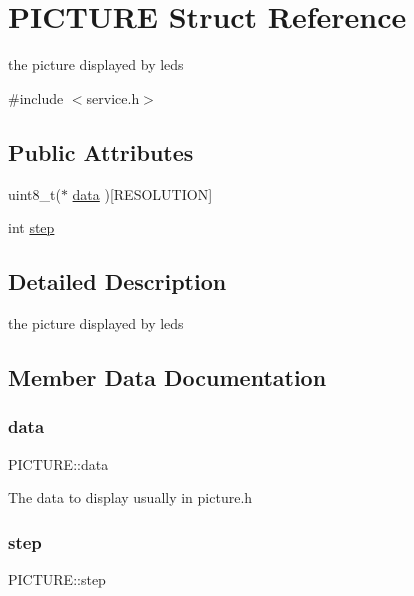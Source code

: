 \hypertarget{struct_p_i_c_t_u_r_e}{}\section{P\+I\+C\+T\+U\+RE Struct Reference}
\label{struct_p_i_c_t_u_r_e}


the picture displayed by leds  




{\ttfamily \#include $<$service.\+h$>$}

\subsection*{Public Attributes}
\begin{DoxyCompactItemize}
\item 
uint8\+\_\+t($\ast$ \mbox{\hyperlink{struct_p_i_c_t_u_r_e_ae753754142009261eb9fc42c2d32af72}{data}} )\mbox{[}R\+E\+S\+O\+L\+U\+T\+I\+ON\mbox{]}
\item 
int \mbox{\hyperlink{struct_p_i_c_t_u_r_e_a1073fabddc8e98b0ca92bed4f7242e3f}{step}}
\end{DoxyCompactItemize}


\subsection{Detailed Description}
the picture displayed by leds 

\subsection{Member Data Documentation}
\mbox{\label{struct_p_i_c_t_u_r_e_ae753754142009261eb9fc42c2d32af72}} 
\subsubsection{\texorpdfstring{data}{data}}
{\footnotesize\ttfamily P\+I\+C\+T\+U\+R\+E\+::data}

The data to display usually in picture.\+h \mbox{\label{struct_p_i_c_t_u_r_e_a1073fabddc8e98b0ca92bed4f7242e3f}} 
\subsubsection{\texorpdfstring{step}{step}}
{\footnotesize\ttfamily P\+I\+C\+T\+U\+R\+E\+::step}


